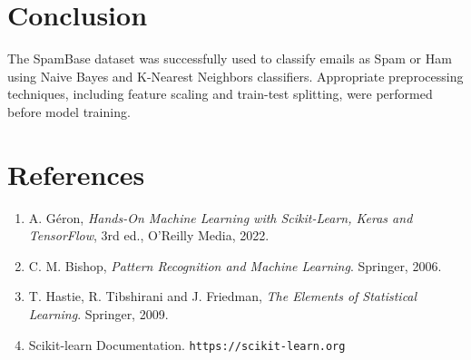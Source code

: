 \documentclass{article}
\begin{document}
\section{Conclusion}

The SpamBase dataset was successfully used to classify emails as Spam or Ham using Naive Bayes and K-Nearest Neighbors classifiers. Appropriate preprocessing techniques, including feature scaling and train-test splitting, were performed before model training.

\section{References}

\begin{enumerate}
\item A. Géron, \textit{Hands-On Machine Learning with Scikit-Learn, Keras and TensorFlow}, 3rd ed., O'Reilly Media, 2022.

\item C. M. Bishop, \textit{Pattern Recognition and Machine Learning}. Springer, 2006.

\item T. Hastie, R. Tibshirani and J. Friedman, \textit{The Elements of Statistical Learning}. Springer, 2009.

\item Scikit-learn Documentation. \texttt{https://scikit-learn.org}


\end{enumerate}
\end{document}
